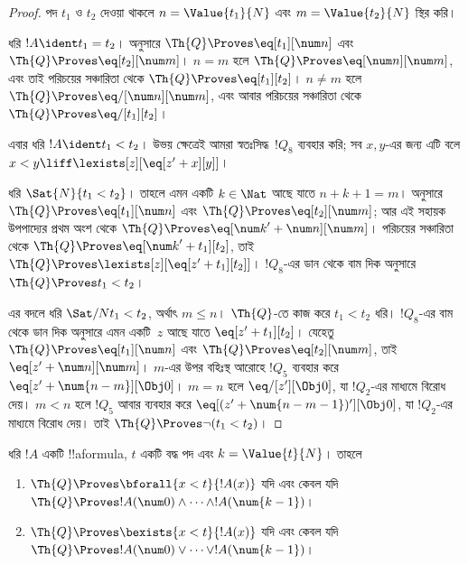 \documentclass[../../../include/open-logic-section]{subfiles}
\begin{document}
\begin{proof}
পদ $t_1$ ও $t_2$ দেওয়া থাকলে $n = \Value{t_1}{N}$ এবং
$m = \Value{t_2}{N}$ স্থির করি।

ধরি $!A \ident t_1 = t_2$।  অনুসারে
$\Th{Q} \Proves \eq[t_1][\num n]$ এবং
$\Th{Q} \Proves \eq[t_2][\num m]$।
$n = m$ হলে $\Th{Q} \Proves \eq[\num n][\num m]$, এবং তাই পরিচয়ের
সঞ্চারিতা থেকে $\Th{Q} \Proves \eq[t_1][t_2]$। $n \neq m$ হলে
$\Th{Q} \Proves \eq/[\num n][\num m]$, এবং আবার পরিচয়ের সঞ্চারিতা থেকে
$\Th{Q} \Proves \eq/[t_1][t_2]$।

এবার ধরি $!A \ident t_1 < t_2$। উভয় ক্ষেত্রেই আমরা স্বতঃসিদ্ধ~$!Q_8$
ব্যবহার করি; সব $x,y$-এর জন্য এটি বলে
$x < y \liff \lexists[z][\eq[z' + x][y]]$।

ধরি $\Sat{N}{t_1 < t_2}$। তাহলে এমন একটি $k \in \Nat$ আছে যাতে
$n + k + 1 = m$।  অনুসারে
$\Th{Q} \Proves \eq[t_1][\num n]$ এবং
$\Th{Q} \Proves \eq[t_2][\num m]$; আর এই সহায়ক উপপাদ্যের প্রথম অংশ থেকে
$\Th{Q} \Proves \eq[{\num k}' + \num n][\num m]$।
পরিচয়ের সঞ্চারিতা থেকে
$\Th{Q} \Proves \eq[{\num k}' + t_1][t_2]$, তাই
$\Th{Q} \Proves \lexists[z][\eq[z' + t_1][t_2]]$। $!Q_8$-এর ডান থেকে বাম
দিক অনুসারে $\Th{Q} \Proves t_1 < t_2$।

এর বদলে ধরি $\Sat/{N}{t_1 < t_2}$, অর্থাৎ $m \leq n$।
%
$\Th{Q}$-তে কাজ করে $t_1 < t_2$ ধরি। $!Q_8$-এর বাম থেকে ডান দিক অনুসারে
এমন একটি~$z$ আছে যাতে $\eq[z' + t_1][t_2]$। যেহেতু
$\Th{Q} \Proves \eq[t_1][\num n]$ এবং
$\Th{Q} \Proves \eq[t_2][\num m]$, তাই
$\eq[z' + \num n][\num m]$।
%
$m$-এর উপর বহিঃস্থ আরোহে $!Q_5$ ব্যবহার করে
$\eq[z' + \num{n - m}][\Obj 0]$। $m = n$ হলে
$\eq/[z'][\Obj 0]$, যা $!Q_2$-এর মাধ্যমে বিরোধ দেয়। $m < n$ হলে $!Q_5$
আবার ব্যবহার করে $\eq[(z' + \num{n - m - 1})'][\Obj 0]$, যা
$!Q_2$-এর মাধ্যমে বিরোধ দেয়।
তাই $\Th{Q} \Proves \lnot(t_1 < t_2)$।
\end{proof}

\begin{lem}
ধরি $!A$ একটি !!a{formula}, $t$ একটি বদ্ধ পদ এবং $k=\Value{t}{N}$। তাহলে
\begin{enumerate}
\item $\Th{Q} \Proves \bforall{x<t}{!A(x)}$ যদি এবং কেবল যদি
    $\Th{Q} \Proves !A(\num 0) \land \dots \land !A(\num{k-1})$।
\item $\Th{Q} \Proves \bexists{x<t}{!A(x)}$ যদি এবং কেবল যদি
    $\Th{Q} \Proves !A(\num 0) \lor \dots \lor !A(\num{k-1})$।
\end{enumerate}
\end{lem}
\end{document}
